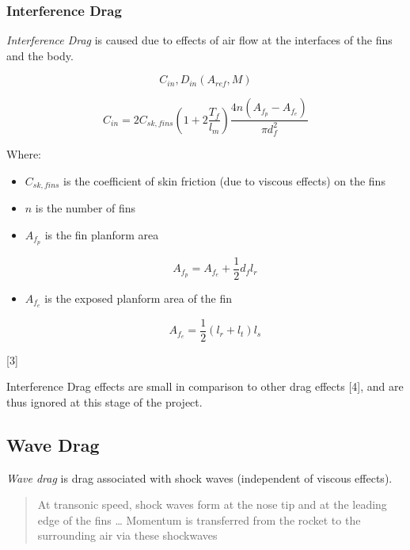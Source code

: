 \documentclass[]{book}
\providecommand{\tightlist}{%
  \setlength{\itemsep}{0pt}\setlength{\parskip}{0pt}}
\begin{document}
\subsubsection{Interference Drag}\label{interference-drag}

\emph{Interference Drag} is caused due to effects of air flow at the
interfaces of the fins and the body.

\begin{equation} 
C_{in}, D_{in} (A_{ref}, M) 
\end{equation}

\begin{equation}
\label{eq_interference_drag_coefficient}
C_{in} = 2 C_{sk,fins} \left( 1 + 2 \dfrac{T_f}{l_m} \right) \dfrac{4n(A_{f_p}-A_{f_e})} {\pi d^2_f}
\end{equation}

Where:

\begin{itemize}
\tightlist
\item
  \(C_{sk,fins}\) is the coefficient of skin friction (due to viscous
  effects) on the fins
\item
  \(n\) is the number of fins
\item
  \(A_{f_p}\) is the fin planform area

  \begin{equation}
  \label{eq_fin_planform_area}
  A_{f_p} = A_{f_e} + \dfrac{1}{2} d_f l_r
  \end{equation}
\item
  \(A_{f_e}\) is the exposed planform area of the fin

  \begin{equation}
  \label{eq_exposed_fin_planform_area}
  A_{f_e} = \dfrac{1}{2} (l_r + l_t) l_s 
  \end{equation}
\end{itemize}

{[}3{]}

Interference Drag effects are small in comparison to other drag effects
{[}4{]}, and are thus ignored at this stage of the project.

\subsection{Wave Drag}\label{wave-drag}

\emph{Wave drag} is drag associated with shock waves (independent of
viscous effects).

\begin{quote}
At transonic speed, shock waves form at the nose tip and at the leading
edge of the fins \ldots{} Momentum is transferred from the rocket to the
surrounding air via these shockwaves
\end{quote}
\end{document}
